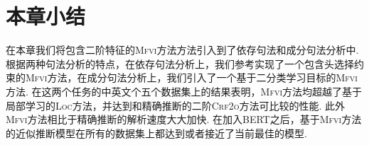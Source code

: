 \section{本章小结}

在本章我们将包含二阶特征的\textsc{Mfvi}方法方法引入到了依存句法和成分句法分析中.
根据两种句法分析的特点，在依存句法分析上，我们参考\citep{wang-tu-2020-second}实现了一个包含头选择约束的\textsc{Mfvi}方法，在成分句法分析上，我们引入了一个基于二分类学习目标的\textsc{Mfvi}方法.
在这两个任务的中英文个五个数据集上的结果表明，\textsc{Mfvi}方法均超越了基于局部学习的\textsc{Loc}方法，并达到和精确推断的二阶\textsc{Crf2o}方法可比较的性能.
此外\textsc{Mfvi}方法相比于精确推断的解析速度大大加快.
在加入BERT之后，基于\textsc{Mfvi}方法的近似推断模型在所有的数据集上都达到或者接近了当前最佳的模型.